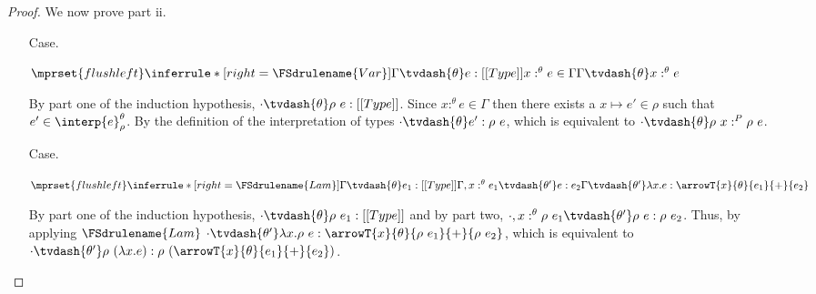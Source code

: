 \begin{proof}
  We now prove part ii.
  \begin{itemize}
  \item[Case.] \ \\
    \begin{center}
      \begin{math}
        $$\mprset{flushleft}
        \inferrule* [right=\FSdrulename{Var}]{
          \Gamma \tvdash{\theta} e:[[Type]]
          \\\\
          x:^{\theta} e \in \Gamma
        }{\Gamma \tvdash{\theta} x:^{\theta} e}
      \end{math}
    \end{center}
    By part one of the induction hypothesis, $\cdot \tvdash{\theta} \rho\ e:[[Type]]$.  Since
    $x:^{\theta} e \in \Gamma$ then there exists a $x \mapsto e' \in \rho$ such that 
    $e' \in \interp{e}^\theta_\rho$.  By the definition of the interpretation of types
    $\cdot \tvdash{\theta} e':\rho\ e$, which is equivalent to 
    $\cdot \tvdash{\theta} \rho\ x:^{P} \rho\ e$.
    

  \item[Case.]\ \\
    \begin{center}
      \begin{math}
        $$\mprset{flushleft}
        \inferrule* [right=\FSdrulename{Lam}] {
          \Gamma \tvdash{\theta} e_1:[[Type]]
          \\\\
          \Gamma,x:^{\theta} e_1 \tvdash{\theta'} e:e_2
        }{\Gamma \tvdash{\theta'} 
          \lambda x.e:\arrowT{x}{\theta}{e_1}{+}{e_2}}
      \end{math}
    \end{center}
    By part one of the induction hypothesis, $\cdot \tvdash{\theta} \rho\ e_1:[[Type]]$ and
    by part two, $\cdot,x:^{\theta} \rho\ e_1 \tvdash{\theta'} \rho\ e:\rho\ e_2$.  Thus, by
    applying $\FSdrulename{Lam}$ 
    $\cdot \tvdash{\theta'} \lambda x.\rho\ e:\arrowT{x}{\theta}{\rho\ e_1}{+}{\rho\ e_2}$, which
    is equivalent to 
    $\cdot \tvdash{\theta'} \rho\ (\lambda x.e):\rho\ (\arrowT{x}{\theta}{e_1}{+}{e_2})$.


\end{itemize}
\end{proof}
